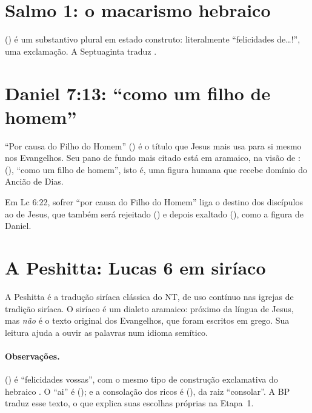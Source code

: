 \section{Salmo 1: o macarismo hebraico}

 () é um substantivo plural em estado construto:
literalmente \enquote{felicidades de\ldots!}, uma exclamação. A Septuaginta
traduz .


\section{Daniel 7:13: \enquote{como um filho de homem}}

\enquote{Por causa do Filho do Homem} () é o título que Jesus
mais usa para si mesmo nos Evangelhos. Seu pano de fundo mais citado está em
aramaico, na visão de :  (),
\enquote{como um filho de homem}, isto é, uma figura humana que recebe domínio
do Ancião de Dias.


\begin{nota}
Em Lc 6:22, sofrer \enquote{por causa do Filho do Homem} liga o destino dos
discípulos ao de Jesus, que também será rejeitado () e depois
exaltado (), como a figura de Daniel.
\end{nota}

\section{A Peshitta: Lucas 6 em siríaco}

A Peshitta é a tradução siríaca clássica do NT, de uso contínuo nas igrejas
de tradição siríaca. O siríaco é um dialeto aramaico: próximo da língua de
Jesus, mas \emph{não} é o texto original dos Evangelhos, que foram escritos em
grego. Sua leitura ajuda a ouvir as palavras num idioma semítico.


\paragraph{Observações.}  () é
\enquote{felicidades vossas}, com o mesmo tipo de construção exclamativa do
hebraico . O \enquote{ai} é  (); e a consolação dos
ricos é  (), da raiz \enquote{consolar}. A BP traduz
esse texto, o que explica suas escolhas próprias na Etapa~1.

